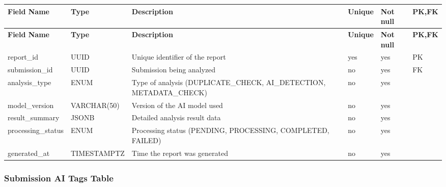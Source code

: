 \vspace{0.5em}
\renewcommand{\arraystretch}{1.15}
\setlength{\tabcolsep}{4pt}
\small
\begin{longtable}{|>{\raggedright\arraybackslash}p{}|>{\raggedright\arraybackslash}p{}|>{\raggedright\arraybackslash}p{}|>{\centering\arraybackslash}p{}|>{\centering\arraybackslash}p{}|>{\centering\arraybackslash}p{}|}
\hline
\textbf{Field Name} & \textbf{Type} & \textbf{Description} & \textbf{Unique} & \textbf{Not null} & \textbf{PK,FK} \\
\hline
\endfirsthead
\textbf{Field Name} & \textbf{Type} & \textbf{Description} & \textbf{Unique} & \textbf{Not null} & \textbf{PK,FK} \\
\hline
\endhead
report\_id & UUID & Unique identifier of the report & yes & yes & PK \\
\hline
submission\_id & UUID & Submission being analyzed & no & yes & FK \\
\hline
analysis\_type & ENUM & Type of analysis (DUPLICATE\_CHECK, AI\_DETECTION, METADATA\_CHECK) & no & yes & \\
\hline
model\_version & VARCHAR(50) & Version of the AI model used & no & yes & \\
\hline
result\_summary & JSONB & Detailed analysis result data & no & yes & \\
\hline
processing\_status & ENUM & Processing status (PENDING, PROCESSING, COMPLETED, FAILED) & no & yes & \\
\hline
generated\_at & TIMESTAMPTZ & Time the report was generated & no & yes & \\
\hline
\end{longtable}

\vspace{1em}
\subsubsection{Submission AI Tags Table}
\label{subsubsec:submission-ai-tags-table}


